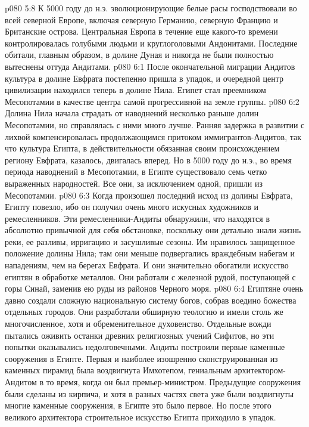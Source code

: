 \vs p080 5:8 \pc К 5000 году до н.э. эволюционирующие белые расы господствовали во всей северной Европе, включая северную Германию, северную Францию и Британские острова. Центральная Европа в течение еще какого\hyp{}то времени контролировалась голубыми людьми и круглоголовыми Андонитами. Последние обитали, главным образом, в долине Дуная и никогда не были полностью вытеснены оттуда Андитами.
\vs p080 6:1 После окончательной миграции Андитов культура в долине Евфрата постепенно пришла в упадок, и очередной центр цивилизации находился теперь в долине Нила. Египет стал преемником Месопотамии в качестве центра самой прогрессивной на земле группы.
\vs p080 6:2 Долина Нила начала страдать от наводнений несколько раньше долин Месопотамии, но справлялась с ними много лучше. Ранняя задержка в развитии с лихвой компенсировалась продолжающимся притоком иммигрантов\hyp{}Андитов, так что культура Египта, в действительности обязанная своим происхождением региону Евфрата, казалось, двигалась вперед. Но в 5000 году до н.э., во время периода наводнений в Месопотамии, в Египте существовало семь четко выраженных народностей. Все они, за исключением одной, пришли из Месопотамии.
\vs p080 6:3 \pc Когда произошел последний исход из долины Евфрата, Египту повезло, ибо он получил очень много искусных художников и ремесленников. Эти ремесленники\hyp{}Андиты обнаружили, что находятся в абсолютно привычной для себя обстановке, поскольку они детально знали жизнь реки, ее разливы, ирригацию и засушливые сезоны. Им нравилось защищенное положение долины Нила; там они меньше подвергались враждебным набегам и нападениям, чем на берегах Евфрата. И они значительно обогатили искусство египтян в обработке металлов. Они работали с железной рудой, поступающей с горы Синай, заменив ею руды из районов Черного моря.
\vs p080 6:4 \pc Египтяне очень давно создали сложную национальную систему богов, собрав воедино божества отдельных городов. Они разработали обширную теологию и имели столь же многочисленное, хотя и обременительное духовенство. Отдельные вожди пытались оживить останки древних религиозных учений Сифитов, но эти попытки оказывались недолговечными. Андиты построили первые каменные сооружения в Египте. Первая и наиболее изошренно сконструированная из каменных пирамид была воздвигнута Имхотепом, гениальным архитектором\hyp{}Андитом в то время, когда он был премьер\hyp{}министром. Предыдущие сооружения были сделаны из кирпича, и хотя в разных частях света уже были воздвигнуты многие каменные сооружения, в Египте это было первое. Но после этого великого архитектора строительное искусство Египта приходило в упадок.
